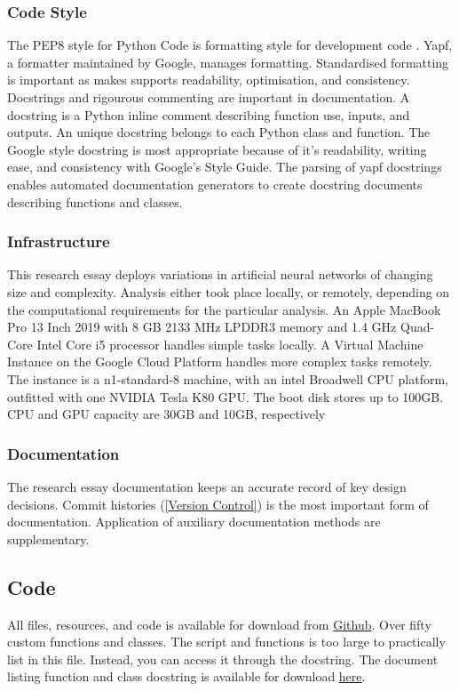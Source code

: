 \documentclass[12pt]{article}
\begin{document}
\subsubsection{Code Style} \label{CS}
The PEP8 style for Python Code is formatting style for development code \cite{PEP8}.
Yapf, a formatter maintained by Google, manages formatting.
Standardised formatting is important as makes supports readability, optimisation, and consistency.
Docstrings and rigourous commenting are important in documentation.
A docstring is a Python inline comment describing function use, inputs, and outputs.
An unique docstring belongs to each Python class and function.
The Google style docstring is most appropriate because of it's readability, writing ease, and consistency with Google's Style Guide.
The parsing of yapf docstrings enables automated documentation generators to create docstring documents describing functions and classes.

\subsubsection{Infrastructure}
This research essay deploys variations in artificial neural networks of changing size and complexity.
Analysis either took place locally, or remotely, depending on the computational requirements for the particular analysis.
An Apple MacBook Pro 13 Inch 2019 with 8 GB 2133 MHz LPDDR3 memory and 1.4 GHz Quad-Core Intel Core i5 processor handles simple tasks locally.
A Virtual Machine Instance on the Google Cloud Platform handles more complex tasks remotely.
The instance is a n1-standard-8 machine, with an intel Broadwell CPU platform, outfitted with one NVIDIA Tesla K80 GPU.
The boot disk stores up to 100GB. CPU and GPU capacity are 30GB and 10GB, respectively

\subsubsection{Documentation}
The research essay documentation keeps an accurate record of key design decisions.
Commit histories (\ref{Version Control}) is the most important form of documentation.
Application of auxiliary documentation methods are supplementary.
\subsection{Code} \label{code}
All files, resources, and code is available for download from \href{https://github.com/CMCD1996/finance-honours}{Github}.
Over fifty custom functions and classes.
The script and functions is too large to practically list in this file. Instead, you can access it through the docstring.
The document listing function and class docstring is available for download \href{https://connormcdowall.com/downloads/cmcd398-finance-honours-code-listing.pdf}{here}.
\end{document}

